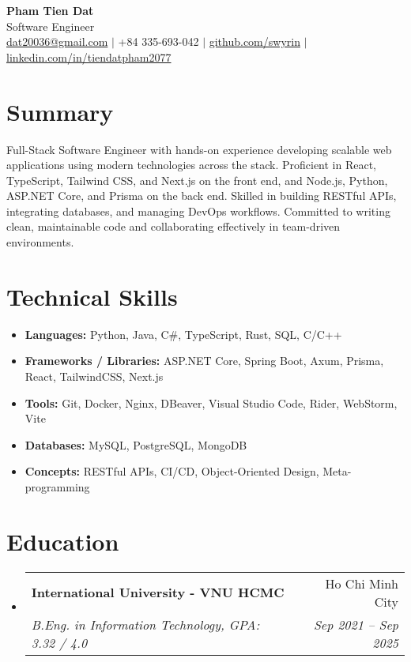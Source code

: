 \documentclass[letterpaper,11pt]{article}
\makeatletter
\newcommand{\resumeSubheading}[4]{
  \item
    \begin{tabular*}{\textwidth}{l@{\extracolsep{\fill}}r}
      \textbf{#1} & #2 \\
      \textit{#3} & \textit{#4} \\
    \end{tabular*}
}
\newcommand{\resumeSectionStart}{\begin{itemize}[leftmargin=0.15in, label={}]}
\newcommand{\resumeSectionEnd}{\end{itemize}}
\makeatother
\begin{document}
\begin{center}
  \textbf{\Huge Pham Tien Dat} \\ \vspace{1pt}
  Software Engineer \\ \vspace{1pt}
  \href{mailto:dat20036@gmail.com}{dat20036@gmail.com} $|$
  +84 335-693-042 $|$
  \href{https://github.com/swyrin}{github.com/swyrin} $|$
  \href{https://linkedin.com/in/tiendatpham2077}{linkedin.com/in/tiendatpham2077}
\end{center}

\section*{Summary}
Full-Stack Software Engineer with hands-on experience developing scalable web applications using modern technologies across the stack. Proficient in React, TypeScript, Tailwind CSS, and Next.js on the front end, and Node.js, Python, ASP.NET Core, and Prisma on the back end. Skilled in building RESTful APIs, integrating databases, and managing DevOps workflows. Committed to writing clean, maintainable code and collaborating effectively in team-driven environments.

\section*{Technical Skills}
\resumeSectionStart
  \item \textbf{Languages:} Python, Java, C\#, TypeScript, Rust, SQL, C/C++
  \item \textbf{Frameworks / Libraries:} ASP.NET Core, Spring Boot, Axum, Prisma, React, TailwindCSS, Next.js
  \item \textbf{Tools:} Git, Docker, Nginx, DBeaver, Visual Studio Code, Rider, WebStorm, Vite
  \item \textbf{Databases:} MySQL, PostgreSQL, MongoDB
  \item \textbf{Concepts:} RESTful APIs, CI/CD, Object-Oriented Design, Meta-programming
\resumeSectionEnd

\section*{Education}
\resumeSectionStart
  \resumeSubheading
    {International University - VNU HCMC}{Ho Chi Minh City}
    {B.Eng. in Information Technology, GPA: 3.32 / 4.0}{Sep 2021 -- Sep 2025}
\resumeSectionEnd
\end{document}
